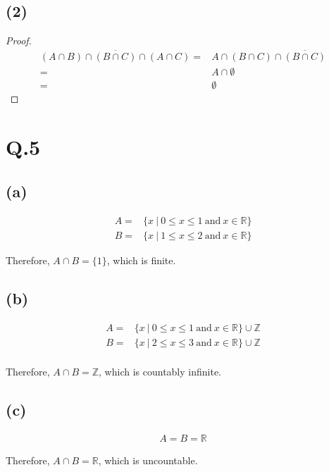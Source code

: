 \documentclass[a4paper,12pt]{article}
\begin{document}
\subsection*{(2)}
\begin{proof}
\begin{align*}
	(A \cap B) \cap \overline{(B \cap C)} \cap (A \cap C) =& A \cap (B \cap C) \cap \overline{(B \cap C)}\\
	=& A \cap \emptyset\\
	=& \emptyset
\end{align*}
\end{proof}

\section*{Q.5}

\subsection*{(a)}

\begin{align*}
	A =& \{x\ |\ 0 \le x \le 1 \  \text{and}\ x \in \mathbb{R}\}\\
	B =& \{x\ |\ 1 \le x \le 2 \  \text{and}\ x \in \mathbb{R}\}
\end{align*}

Therefore, $A \cap B = \{1\}$, which is finite.

\subsection*{(b)}
\begin{align*}
	A =& \{x\ |\ 0 \le x \le 1 \  \text{and}\ x \in \mathbb{R}\} \cup \mathbb{Z}\\
	B =& \{x\ |\ 2 \le x \le 3 \  \text{and}\ x \in \mathbb{R}\} \cup \mathbb{Z}\\
\end{align*}

Therefore, $A \cap B = \mathbb{Z}$, which is countably infinite.

\subsection*{(c)}
\begin{align*}
	A = B = \mathbb{R}
\end{align*}

Therefore, $A \cap B = \mathbb{R}$, which is uncountable.
\end{document}
